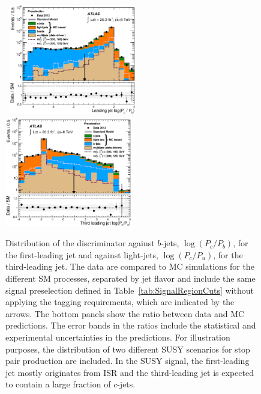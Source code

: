 \begin{figure}[!ht]
  \begin{center}
    \mbox{
      \includegraphics[width=0.495\textwidth]{Appendix_CharmTagged/Figures/can_PreselSRT_jet1logPcPb_final_jetflav.eps}
      \includegraphics[width=0.495\textwidth]{Appendix_CharmTagged/Figures/can_PreselSRT_jet3logPcPu_final_jetflav.eps}
    }
  \end{center}
  \caption[Distribution of the discriminator against $b$-jets, $\log{(P_c/P_b)}$, for the first-leading jet and against light-jets, $\log{(P_c/P_u)}$, for the third-leading jet.]
{Distribution of the discriminator against $b$-jets, $\log{(P_c/P_b)}$, for the first-leading jet and against light-jets, $\log{(P_c/P_u)}$, for the third-leading jet.
  The data are compared to MC simulations for the different SM processes, separated by jet flavor and include the same signal preselection defined in Table~\ref{tab:SignalRegionCuts} without applying the tagging requirements, which are indicated by the arrows.
  The bottom panels show the ratio between data and MC predictions. The error bands in the ratios include the statistical and experimental uncertainties in the predictions.
  For illustration purposes, the distribution of two different SUSY scenarios for stop pair production are included.
  In the SUSY signal, the first-leading jet mostly originates from ISR and the third-leading jet is expected to contain a large fraction of $c$-jets.}
  \label{fig:CharmTaggedDiscriminants}
\end{figure}

